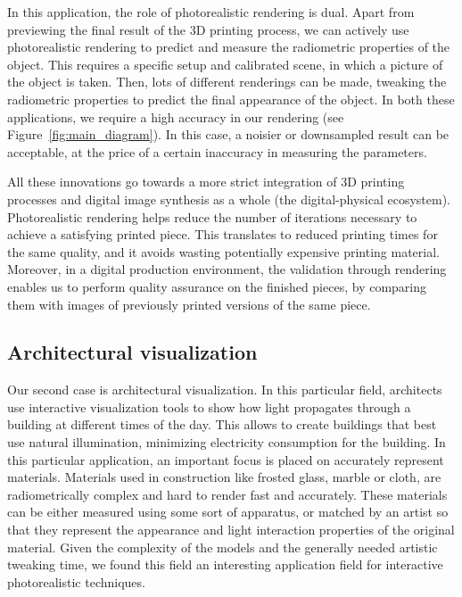 In this application, the role of photorealistic rendering is dual. Apart from previewing the final result of the 3D printing process,   we can actively use photorealistic rendering to predict and measure the radiometric properties of the object. This requires a  specific setup and calibrated scene, in which a picture of the object is taken. Then, lots of different renderings can be made, tweaking the radiometric properties to predict the final appearance of the object. In both these applications, we require a high accuracy in our rendering (see Figure~\ref{fig:main_diagram}). In this case, a noisier or downsampled result can be acceptable, at the price of a certain inaccuracy in measuring the parameters. 

All these innovations go towards a more strict integration of 3D printing processes and digital image synthesis as a whole (the digital-physical ecosystem). Photorealistic rendering helps reduce the number of iterations necessary to achieve a satisfying printed piece. This translates to reduced printing times for the same quality, and it avoids wasting potentially expensive printing material. Moreover, in a digital production  environment, the validation through rendering enables us to perform quality assurance on the finished pieces, by comparing them with images of previously printed versions of the same piece.

\subsection{Architectural visualization}

Our second case is architectural visualization. In this particular field, architects use interactive visualization tools to show how light propagates through a building at different times of the day. This allows to create buildings that best use natural illumination, minimizing electricity consumption for the building. In this particular application, an important focus is placed on accurately represent materials. Materials used in construction like frosted glass, marble or cloth, are radiometrically complex and hard to render fast and accurately. These materials can be either measured using some sort of apparatus, or matched by an artist so that they represent the appearance and light interaction properties of the original material. Given the complexity of the models and the generally needed artistic tweaking time, we found this field an interesting application field for interactive photorealistic techniques.

